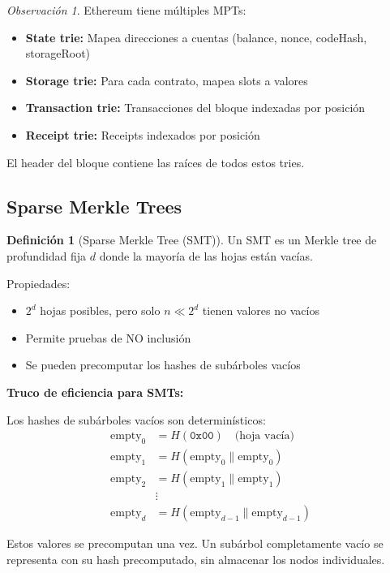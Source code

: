 \documentclass[11pt,a4paper,twoside,openright]{book}
\theoremstyle{definition}
\newtheorem{definition}{Definición}[chapter]
\theoremstyle{plain}
\theoremstyle{remark}
\newtheorem{remark}{Observación}[chapter]
\begin{document}
\begin{remark}
Ethereum tiene múltiples MPTs:
\begin{itemize}
    \item \textbf{State trie:} Mapea direcciones a cuentas (balance, nonce, codeHash, storageRoot)
    \item \textbf{Storage trie:} Para cada contrato, mapea slots a valores
    \item \textbf{Transaction trie:} Transacciones del bloque indexadas por posición
    \item \textbf{Receipt trie:} Receipts indexados por posición
\end{itemize}

El header del bloque contiene las raíces de todos estos tries.
\end{remark}

\subsection{Sparse Merkle Trees}

\begin{definition}[Sparse Merkle Tree (SMT)]
Un SMT es un Merkle tree de profundidad fija $d$ donde la mayoría de las hojas están vacías.

Propiedades:
\begin{itemize}
    \item $2^d$ hojas posibles, pero solo $n \ll 2^d$ tienen valores no vacíos
    \item Permite pruebas de NO inclusión
    \item Se pueden precomputar los hashes de subárboles vacíos
\end{itemize}
\end{definition}

\begin{keyidea}
\textbf{Truco de eficiencia para SMTs:}

Los hashes de subárboles vacíos son determinísticos:
\begin{align}
\text{empty}_0 &= H(\texttt{0x00}) \quad \text{(hoja vacía)} \\
\text{empty}_1 &= H(\text{empty}_0 \| \text{empty}_0) \\
\text{empty}_2 &= H(\text{empty}_1 \| \text{empty}_1) \\
&\vdots \\
\text{empty}_d &= H(\text{empty}_{d-1} \| \text{empty}_{d-1})
\end{align}

Estos valores se precomputan una vez. Un subárbol completamente vacío se representa con su hash precomputado, sin almacenar los nodos individuales.
\end{keyidea}
\end{document}
